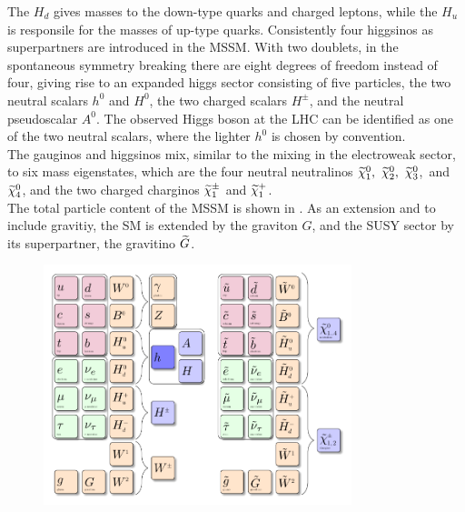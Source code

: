 The $H_d$ gives masses to the down-type quarks and charged leptons, while the $H_u$ is responsile for the masses of up-type quarks. Consistently four higgsinos as superpartners are introduced in the MSSM. With two doublets, in the spontaneous symmetry breaking there are eight degrees of freedom instead of four, giving rise to an expanded higgs sector consisting of five particles, the two neutral scalars $h^0$ and $H^0$, the two charged scalars $H^{\pm}$, and the neutral pseudoscalar $A^0$. The observed Higgs boson at the LHC can be identified as one of the two neutral scalars, where the lighter $h^0$ is chosen by convention.\\
The gauginos and higgsinos mix, similar to the mixing in the electroweak sector, to six mass eigenstates, which are the four neutral neutralinos $\widetilde{\chi}^{0}_{1},~\widetilde{\chi}^{0}_{2},~\widetilde{\chi}^{0}_{3}$,~and $\widetilde{\chi}^{0}_{4}$, and the two charged charginos $\widetilde{\chi}^\pm_{1}$ and $\widetilde{\chi}^{+}_{1}$.\\
The total particle content of the MSSM is shown in . As an extension and to include gravitiy, the SM is extended by the graviton $G$, and the SUSY sector by its superpartner, the gravitino $\widetilde{G}$.

\begin{figure}[!htpb]
\centering
  \includegraphics[width=0.8\textwidth]{figures/general/MSSM}
  \caption{}
  \label{fig:mssm}
\end{figure}

